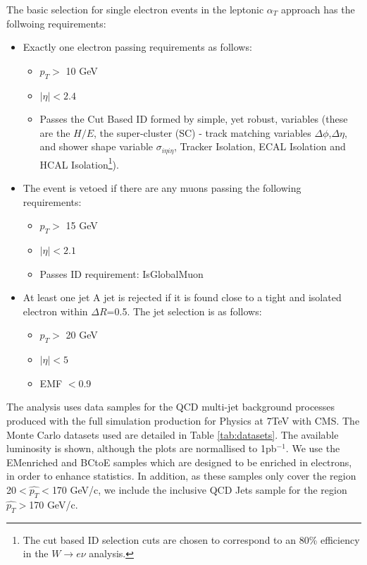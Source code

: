 \documentclass[12pt]{article}
\begin{document}
The basic selection for single electron events in the leptonic $\alpha_{T}$ approach has the follwoing requirements:
\begin{itemize}


\item Exactly one electron passing requirements as follows:
\begin{itemize}
\item $p_{T} >$ 10 GeV
\item $|\eta| <2.4$
\item Passes the Cut Based ID formed by simple, yet robust, variables (these are the $H/E$, the super-cluster (SC) - track matching variables $\Delta \phi$,$\Delta \eta$, and shower shape variable $\sigma_{i\eta i\eta}$, Tracker Isolation, ECAL Isolation and HCAL Isolation\footnote{The cut based ID selection cuts are chosen to correspond to an 80\% efficiency in the $W\rightarrow e\nu$ analysis.}). 
\end{itemize}
\item The event is vetoed if there are any muons passing the following requirements:
\begin{itemize}
\item $p_{T} >$ 15 GeV
\item $|\eta| <2.1$
\item Passes ID requirement: IsGlobalMuon
\end{itemize}
\item At least one jet A jet is rejected if it is found close to a tight and isolated electron within $\Delta R$=0.5.
 The jet selection is as follows:
\begin{itemize}
\item $p_{T} >$ 20 GeV
\item $|\eta| <5$
\item EMF $<$0.9
\end{itemize}

\end{itemize}

The analysis uses data samples for the QCD multi-jet background processes produced with the full simulation production for Physics at 7TeV with CMS. The Monte Carlo datasets used are detailed in Table \ref{tab:datasets}. The available luminosity is shown, although the plots are normallised to 1pb$^{-1}$. We use the EMenriched and BCtoE samples which are designed to be enriched in electrons, in order to enhance statistics. In addition, as these samples only cover the region 20$<\hat{p_{T}}<$170 GeV/c, we include the inclusive QCD Jets sample for the region $\hat{p_{T}}>$170 GeV/c.
\end{document}
